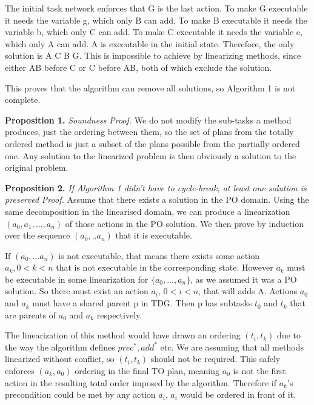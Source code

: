 	The initial task network enforces that G is the last action.
	To make G executable it needs the variable g, which only B can add.
	To make B executable it needs the variable b, which only C can add.
	To make C executable it needs the variable c, which only A can add.
	A is executable in the initial state.
	Therefore, the only solution is A C B G. This is impossible to achieve by linearizing methods, since either AB before C or C before AB, both of which exclude the solution. 
	
	This proves that the algorithm can remove all solutions, so Algorithm 1 is not complete.
	
	
\textbf{Proposition 1.} \textit{Soundness}  \newline
\textit{Proof.}
We do not modify the sub-tasks a method produces, just the ordering between them, so the set of plans from the totally ordered method is just a subset of the plans possible from the partially ordered one. Any solution to the linearized problem is then obviously a solution to the original problem.



\textbf{Proposition 2.} \textit{If Algorithm 1 didn't have to cycle-break, at least one solution is preserved} \newline
\textit{Proof.}
	Assume that there exists a solution in the PO domain. Using the same decomposition in the linearised domain, we can produce a linearization $(a_0, a_1, ..., a_n)$ of those actions in the PO solution. We then prove by induction over the sequence $(a_0, .. a_n)$ that it is executable.
 
	If $(a_0, ... a_n)$ is not executable, that means there exists some action $a_k,  0 < k < n$ that is not executable in the corresponding state.
	However $a_k$ must be executable in some linearization for $\{a_0, ..., a_n\}$, as we assumed it was a PO solution. So there must exist an action $a_i$, $0 < i < n$, that will adds A. Actions $a_0$ and $a_k$ must have a shared parent p in TDG. Then p has subtasks $t_0$ and $t_k$ that are parents of $a_0$ and $a_k$ respectively. 
	
	The linearization of this method would have drawn an ordering $(t_i, t_k)$ due to the way the algorithm defines $prec^{*}, add^{*}$ etc. We are assuming that all methods linearized without conflict, so $(t_i, t_k)$ should not be required. This safely enforces $(a_k, a_0)$ ordering in the final TO plan, meaning $a_0$ is not the first action in the resulting total order imposed by the algorithm. Therefore if $a_k$’s precondition could be met by any action $a_i$, $a_i$ would be ordered in front of it. 
	
